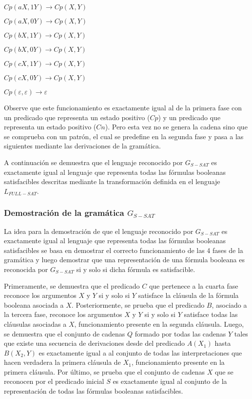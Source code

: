 \documentclass[12pt]{article}
\begin{document}
\begin{itemize}
\begin{enumerate}[start=23]
\begin{multicols}{2}
                  \item $Cp(aX,1Y) \to Cp(X,Y)$
                  \item $Cp(aX,0Y) \to Cp(X,Y)$
                  \item $Cp(bX,1Y) \to Cp(X,Y)$
                  \item $Cp(bX,0Y) \to Cp(X,Y)$
                  \item $Cp(cX,1Y) \to Cp(X,Y)$
                  \item $Cp(cX,0Y) \to Cp(X,Y)$
                  \item $Cp(\varepsilon,\varepsilon)\to \varepsilon$
              \end{multicols}
          \end{enumerate}

          Observe que este funcionamiento es exactamente igual al de la primera fase con un predicado que representa un
          estado positivo ($Cp$) y un predicado que representa un estado positivo ($Cn$). Pero esta vez no se genera
          la cadena sino que se comprueba con un patrón, el cual se predefine en la segunda fase y pasa a las
          siguientes mediante las derivaciones de la gramática.

\end{itemize}

A continuación se demuestra que el lenguaje reconocido por $G_{S-SAT}$ es exactamente igual al lenguaje que representa todas las fórmulas booleanas satisfacibles descritas mediante
la transformación definida en el lenguaje $L_{FULL-SAT}$.

\subsubsection{Demostración de la gramática $G_{S-SAT}$}

La idea para la demostración de que el lenguaje reconocido por $G_{S-SAT}$ es exactamente igual al lenguaje
que representa todas las fórmulas booleanas satisfacibles se basa en demostrar el correcto funcionamiento de las 4
fases de la gramática y luego demostrar que una representación de una fórmula booleana es reconocida por $G_{S-SAT}$
si  y solo si dicha fórmula es satisfacible.

Primeramente, se demuestra que el predicado $C$ que pertenece a la cuarta fase reconoce los argumentos $X$ y $Y$
si y solo si $Y$ satisface la cláusula de la fórmula booleana asociada a $X$. Posteriormente, se prueba que el predicado $B$,
asociado a la tercera fase, reconoce los argumentos $X$ y $Y$ si y solo si $Y$ satisface todas las cláusulas
asociadas a $X$, funcionamiento presente en la segunda cláusula.  Luego, se demuestra  que el conjunto de cadenas
$Q$ formado por todas las cadenas $Y$ tales que existe una secuencia de derivaciones desde del predicado
$A(X_1)$ hasta $B(X_2,Y)$ es exactamente igual a al conjunto de todas las interpretaciones que hacen verdadera
la primera cláusula de $X_1$, funcionamiento presente en la primera cláusula. Por último, se prueba
que el conjunto de cadenas $X$ que se reconocen por el predicado inicial $S$ es exactamente igual al
conjunto de la representación de todas las fórmulas booleanas satisfacibles.
\end{document}
